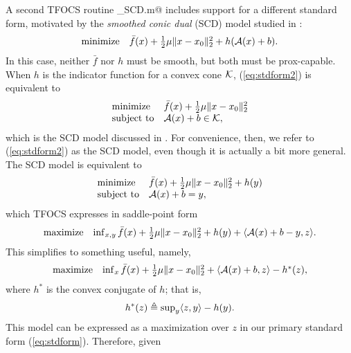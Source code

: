 \documentclass{article}
\begin{document}
A second TFOCS routine \verb@tfocs_SCD.m@ includes support for a 
different standard form, motivated
by the \emph{smoothed conic dual} (SCD) model studied in \cite{TFOCS}:
\begin{equation}
	\label{eq:stdform2}
	\begin{array}{ll}
	\text{minimize} & \bar{f}(x) + {\textstyle\frac{1}{2}}\mu\|x-x_0\|_2^2 + h(\mathcal{A}(x)+b).
	\end{array}
\end{equation}
In this case, neither $\bar{f}$ nor $h$ must be smooth, but both must
be prox-capable. When $h$ is the indicator function for a convex cone
$\mathcal{K}$, (\ref{eq:stdform2}) is equivalent to
\begin{equation}
	\label{eq:stdform3} %
	\begin{array}{ll}
          \text{minimize} &\bar{f}(x) + \thalf\mu\|x-x_0\|_2^2 \\
          \text{subject to} & \cA(x) + b \in \cK,
	\end{array}
\end{equation}
which is the SCD model discussed in \cite{TFOCS}. For convenience,
then, we refer to (\ref{eq:stdform2}) as the SCD model, even though it
is actually a bit more general.  The SCD model is equivalent to 
\[
	\begin{array}{ll}
          \text{minimize} &\bar{f}(x) + {\textstyle\frac{1}{2}}\mu\|x-x_0\|_2^2 + h(y)\\
          \text{subject to} & \mathcal{A}(x) + b = y,
	\end{array}
\]
which TFOCS expresses in saddle-point form
\[
	\begin{array}{ll}
          \text{maximize} & \inf_{x,y} \bar{f}(x) + {\textstyle\frac{1}{2}}\mu\|x-x_0\|_2^2 + h(y) + \langle \mathcal{A}(x)+ b -y,z\rangle. 
	\end{array}
\]
This simplifies to something useful, namely,
\begin{equation}
	\label{eq:stdform3-saddle}
	\begin{array}{ll}
	\text{maximize} & \inf_x \bar{f}(x) + {\textstyle\frac{1}{2}}\mu\|x-x_0\|_2^2 + \langle \mathcal{A}(x)+b,z\rangle - h^*(z),
	\end{array}
\end{equation}
where $h^*$ is the convex conjugate of $h$; that is,
\begin{equation}
	h^*(z) \triangleq \textstyle \sup_y \langle z,y\rangle - h(y).
\end{equation}
This model can be expressed as a maximization over $z$ in
our primary standard form (\ref{eq:stdform}). 
Therefore, given
\end{document}
